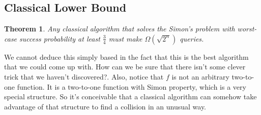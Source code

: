 \documentclass[12pt, oneside]{book}
\newtheorem{theorem}{Theorem}[section]
\theoremstyle{definition}
\theoremstyle{definition}
\theoremstyle{remark}
\begin{document}
\subsection{Classical Lower Bound}
\begin{theorem}
    Any classical algorithm that solves the Simon's problem with worst-case success probability at least $\frac{3}{4}$ must make $\Omega(\sqrt{2^n})$ queries.
\end{theorem}
We cannot deduce this simply based in the fact that this is the best algorithm that we could come up with. How can we be sure that there isn't some clever trick that we haven't discovered?. Also, notice that $f$ is not an arbitrary two-to-one function. It is a two-to-one function with Simon property, which is a very special structure. So it's conceivable that a classical algorithm can somehow take advantage of that structure to find a collision in an unusual way.
\end{document}
